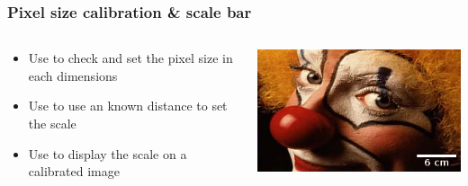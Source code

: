 \documentclass[ignorenonframetext,aspectratio=169,10pt,xcolor=table]{beamer}
\begin{document}
\begin{frame} \frametitle{Pixel size calibration \& scale bar}
  \begin{columns}
    \begin{column}{0.5\textwidth}
      \begin{itemize}
      \item Use  to check and set the
        pixel size in each dimensions
      \item Use  to use an known distance
        to set the scale
      \item Use  to display the scale on
        a calibrated image
      \end{itemize}
    \end{column}
    \begin{column}{0.5\textwidth}
      \includegraphics[width=\textwidth]{clown-scale}
    \end{column}
  \end{columns}
\end{frame}
\end{document}
